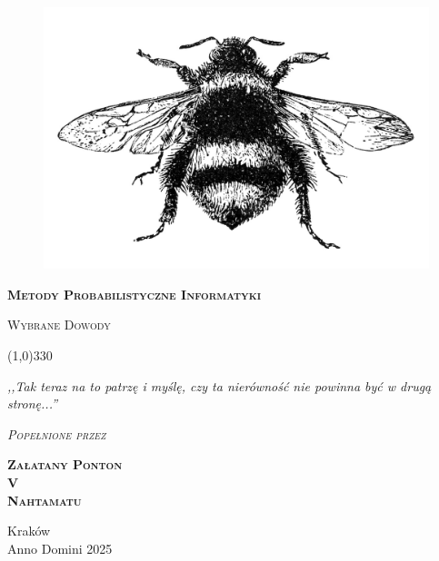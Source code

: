 \begin{titlepage} 

    \begin{center}
         \begin{figure}[h]
            \centering
            \includegraphics[scale=0.75]{img/bumblebee.jpg}
        \end{figure}
        \vspace{0.5cm}
        \Huge
        \textbf{\textsc{Metody Probabilistyczne Informatyki}}
        
        \vspace{0.5cm}
        \Large
        \textsc{Wybrane Dowody}
        
        \normalsize
        
        
        \line(1,0){330}
        
        \vspace{1cm}
        \textit{,,Tak teraz na to patrzę i myślę, czy ta nierówność nie powinna być w drugą stronę...''}
        \vspace{1cm}

        \textit{\textsc{Popełnione przez}}\\
        \vspace{5mm}
  
        \textbf{\textsc{
            Załatany Ponton \\
            V\\
            Nahtamatu\\
        }}
 
        \vfill

        Kraków \\
        Anno Domini 2025
        
    \end{center}
    
\end{titlepage}
